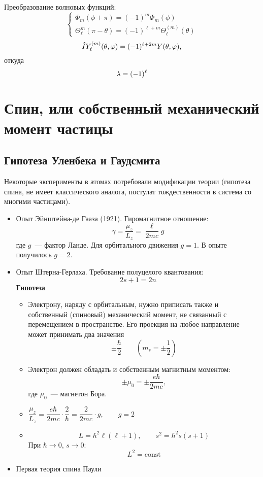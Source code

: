 Преобразование волновых функций:
$$
    \begin{cases}
        \Phi_m (\phi + \pi) = (-1)^m \Phi_m (\phi)\\
        \Theta_\ell^m (\pi - \theta) = (-1)^{\ell + m} \Theta_\ell ^{(m)} (\theta)
    \end{cases}
$$
$$
    \Hat I Y_\ell ^{(m)} (\theta, \phi) = (-1)^{\ell + 2m} Y(\theta, \phi),
$$
откуда
$$
    \lam = (-1)^{\ell }
$$

\section{Спин, или собственный механический момент частицы}
\subsection{Гипотеза Уленбека и Гаудсмита}
Некоторые эксперименты в атомах потребовали модификации теории (гипотеза спина, не имеет классического аналога, постулат тождественности в система со многими частицами).
\begin{itemize}
  \item Опыт Эйнштейна-де Гааза (1921).
  Гиромагнитное отношение:
  $$
    \gamma = \dfrac{\mu_z}{L_z} = \dfrac{\ell}{2mc} g
  $$
  где $g$~--- фактор Ланде. Для орбитального движения $g = 1$. В опыте получилось $g = 2$.
  \item Опыт Штерна-Герлаха. Требование полуцелого квантования:
  $$
    2s + 1 = 2n
  $$
  \textbf{Гипотеза}
  \begin{itemize}
    \item   Электрону, наряду с орбитальным, нужно приписать также и собственный (спиновый) механический момент, не связанный с перемещением в пространстве. Его проекция на любое направление может принимать два значения
  $$
    \pm \dfrac{\hbar}{2} \qquad (m_s = \pm\dfrac12)
  $$
    \item Электрон должен обладать и собственным магнитным моментом:
    $$
        \pm \mu_0 = \pm \dfrac{e \hbar}{2mc},
    $$
    где $\mu_0$~--- магнетон Бора.
  \end{itemize}
  \Rem
  \begin{itemize}
    \item $\dfrac{\mu_z}{L_z} = \dfrac{e\hbar}{2mc} \cdot \dfrac{2}{\hbar} = \dfrac{2}{2mc} \cdot g, \qquad g = 2$
    \item
    $$
        L = \hbar^2 \ell (\ell + 1), \qquad s^2 = \hbar^2 s(s+1)
    $$
    При $\hbar \to 0$, $s \to 0$:
    $$
        L^2 = \mathrm{const}
    $$
  \end{itemize}
  \item Первая теория спина Паули
\end{itemize}
\endgroup

